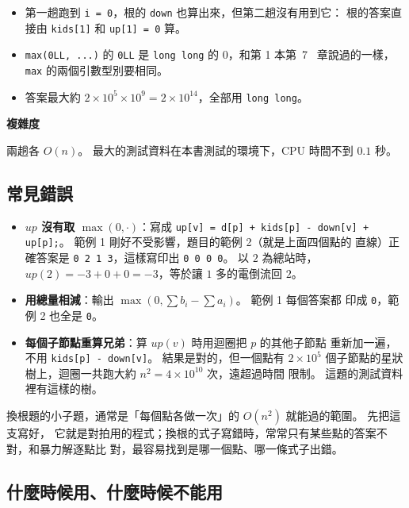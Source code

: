 \begin{itemize}
\item 第一趟跑到 \texttt{i = 0}，根的 \texttt{down} 也算出來，但第二趟沒有用到它：
根的答案直接由 \texttt{kids[1]} 和 \texttt{up[1] = 0} 算。
\item \texttt{max(0LL, ...)} 的 \texttt{0LL} 是 \texttt{long long} 的 $0$，和第 1 本第~7
~章說過的一樣，\texttt{max} 的兩個引數型別要相同。
\item 答案最大約 $2 \times 10^5 \times 10^9 = 2 \times 10^{14}$，全部用
\texttt{long long}。
\end{itemize}

\textbf{複雜度}

兩趟各 $O(n)$。 最大的測試資料在本書測試的環境下，CPU 時間不到 $0.1$ 秒。

\subsection{常見錯誤}

\begin{itemize}
\item \textbf{$\mathit{up}$ 沒有取 $\max(0, \cdot)$}：寫成 \texttt{up[v] = d[p] +
kids[p] - down[v] + up[p];}。 範例 1 剛好不受影響，題目的範例 2（就是上面四個點的
直線）正確答案是 \texttt{0 2 1 3}，這樣寫印出 \texttt{0 0 0 0}。 以 $2$ 為總站時，
$\mathit{up}(2) = -3 + 0 + 0 = -3$，等於讓 $1$ 多的電倒流回 $2$。
\item \textbf{用總量相減}：輸出 $\max(0, \sum b_i - \sum a_i)$。 範例 1 每個答案都
印成 \texttt{0}，範例 2 也全是 \texttt{0}。
\item \textbf{每個子節點重算兄弟}：算 $\mathit{up}(v)$ 時用迴圈把 $p$ 的其他子節點
重新加一遍，不用 \texttt{kids[p] - down[v]}。 結果是對的，但一個點有 $2 \times
10^5$ 個子節點的星狀樹上，迴圈一共跑大約 $n^2 = 4 \times 10^{10}$ 次，遠超過時間
限制。 這題的測試資料裡有這樣的樹。
\end{itemize}

\begin{apcsnote}
換根題的小子題，通常是「每個點各做一次」的 $O(n^2)$ 就能過的範圍。 先把這支寫好，
它就是對拍用的程式；換根的式子寫錯時，常常只有某些點的答案不對，和暴力解逐點比
對，最容易找到是哪一個點、哪一條式子出錯。
\end{apcsnote}

\subsection{什麼時候用、什麼時候不能用}

